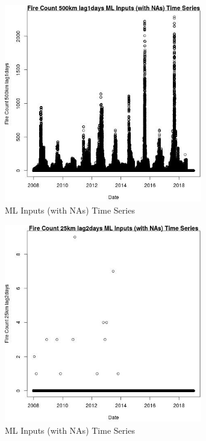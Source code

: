 \begin{figure} 
\centering  
\includegraphics[width=0.77\textwidth]{Code_Outputs/Report_ML_input_PM25_Step4_part_e_de_duplicated_aves_compiled_2019-05-21wNAs_Fire_Count_500km_lag1daysvDate.jpg} 
\caption{\label{fig:Report_ML_input_PM25_Step4_part_e_de_duplicated_aves_compiled_2019-05-21wNAsFire_Count_500km_lag1daysvDate}ML Inputs (with NAs) Time Series} 
\end{figure} 
 

\begin{figure} 
\centering  
\includegraphics[width=0.77\textwidth]{Code_Outputs/Report_ML_input_PM25_Step4_part_e_de_duplicated_aves_compiled_2019-05-21wNAs_Fire_Count_25km_lag2daysvDate.jpg} 
\caption{\label{fig:Report_ML_input_PM25_Step4_part_e_de_duplicated_aves_compiled_2019-05-21wNAsFire_Count_25km_lag2daysvDate}ML Inputs (with NAs) Time Series} 
\end{figure} 
 


